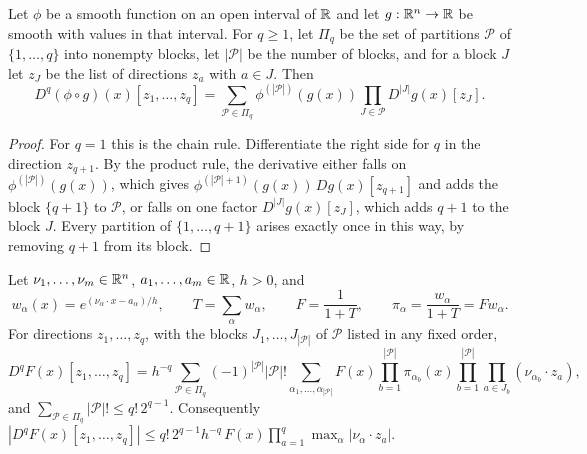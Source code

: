 \begin{fact}\label{tb:faa}
Let \(\phi\) be a smooth function on an open interval of \(\mathbb R\) and let
\(g:\mathbb R^n\to\mathbb R\) be smooth with values in that interval. For \(q\ge1\), let
\(\Pi_q\) be the set of partitions \(\mathcal P\) of \(\{1,\ldots,q\}\) into
nonempty blocks, let \(|\mathcal P|\) be the number of blocks, and for a
block \(J\) let \(z_J\) be the list of directions \(z_a\) with
\(a\in J\). Then
\[
 D^q(\phi\circ g)(x)[z_1,\ldots,z_q]
 =\sum_{\mathcal P\in\Pi_q}\phi^{(|\mathcal P|)}(g(x))
  \prod_{J\in\mathcal P}D^{|J|}g(x)[z_J].
\]
\end{fact}

\begin{proof}
For \(q=1\) this is the chain rule. Differentiate the right side for \(q\)
in the direction \(z_{q+1}\). By the product rule, the derivative either
falls on \(\phi^{(|\mathcal P|)}(g(x))\), which gives
\(\phi^{(|\mathcal P|+1)}(g(x))\,Dg(x)[z_{q+1}]\) and adds the block
\(\{q+1\}\) to \(\mathcal P\), or falls on one factor
\(D^{|J|}g(x)[z_J]\), which adds \(q+1\) to the block \(J\). Every partition
of \(\{1,\ldots,q+1\}\) arises exactly once in this way, by removing
\(q+1\) from its block.
\end{proof}

\begin{fact}\label{tb:logistic}
Let \(\nu_1,\ldots,\nu_m\in\mathbb R^n\), \(a_1,\ldots,a_m\in\mathbb R\), \(h>0\), and
\[
 w_\alpha(x)=e^{(\nu_\alpha\cdot x-a_\alpha)/h},\qquad
 T=\sum_\alpha w_\alpha,\qquad
 F=\frac1{1+T},\qquad
 \pi_\alpha=\frac{w_\alpha}{1+T}=Fw_\alpha .
\]
For directions \(z_1,\ldots,z_q\), with the blocks \(J_1,\ldots,J_{|\mathcal P|}\)
of \(\mathcal P\) listed in any fixed order,
\[
 D^qF(x)[z_1,\ldots,z_q]
 =h^{-q}\sum_{\mathcal P\in\Pi_q}(-1)^{|\mathcal P|}|\mathcal P|!
 \sum_{\alpha_1,\ldots,\alpha_{|\mathcal P|}}
 F(x)\prod_{b=1}^{|\mathcal P|}\pi_{\alpha_b}(x)
 \prod_{b=1}^{|\mathcal P|}\prod_{a\in J_b}(\nu_{\alpha_b}\cdot z_a),
\]
and \(\sum_{\mathcal P\in\Pi_q}|\mathcal P|!\le q!\,2^{q-1}\). Consequently
\(|D^qF(x)[z_1,\ldots,z_q]|\le q!\,2^{q-1}h^{-q}\,F(x)\prod_{a=1}^q
\max_\alpha|\nu_\alpha\cdot z_a|\).
\end{fact}

